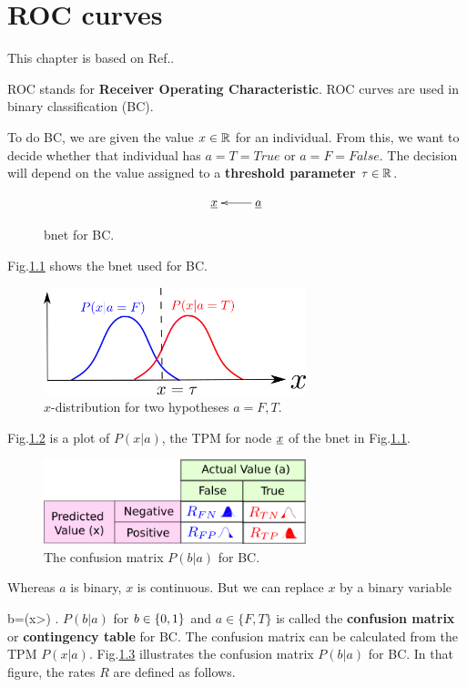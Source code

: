 \chapter{ROC curves}
This chapter is based on Ref.\cite{wiki-roc}.

ROC stands for
{\bf  Receiver Operating Characteristic}.
ROC curves are used in binary
classification (BC).

To do BC, we are given the value
$x\in{ \mathbb{R}}$
for an individual. From this, 
we want to decide
whether that
individual 
has $a=T=True$
or $a=F=False$.
The decision will
depend on the
value
assigned to
a {\bf threshold parameter $\tau\in { \mathbb{R}}$}.


\begin{figure}[h!]
$$\xymatrix{
\rvx&\rva\ar[l]
}$$
\caption{bnet for 
BC.}
\label{fig-hyp-bnet}
\end{figure}
Fig.\ref{fig-hyp-bnet}
shows the bnet used for BC.


\begin{figure}[h!]
\centering
\includegraphics[width=3in]
{roc/bell-curves.png}
\caption{$x$-distribution for
two hypotheses $a=F,T$. } 
\label{fig-bell-curves}
\end{figure}
Fig.\ref{fig-bell-curves}
is a 
plot
of $P(x|a)$, the TPM 
for node ${\underline{x}}$
of the bnet in Fig.\ref{fig-hyp-bnet}.


\begin{figure}[h!]
\centering
\includegraphics[width=3in]
{roc/confusion-mat.png}
\caption{The confusion matrix 
$P(b|a)$
for BC.} 
\label{fig-confusion-mat}
\end{figure}

Whereas $a$
is binary, $x$
is continuous. 
But we can replace
$x$ by a binary variable

\beq
b=\indi(x>\tau)
\;.
\eeq
$P(b|a)$
for $b\in\{0,1\}$
and $a\in \{F,T\}$
is called the
{\bf confusion matrix}
or {\bf contingency table}
for BC.
The confusion
matrix can be
calculated from
the TPM $P(x|a)$.
Fig.\ref{fig-confusion-mat}
illustrates the
confusion matrix
$P(b|a)$
for BC.
In that
figure,
the rates $R$
are defined as
follows.

